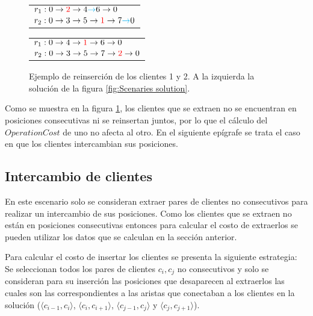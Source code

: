 \documentclass[12pt]{report}
\begin{document}
	\begin{figure}[h]
		\centering
		\begin{minipage}{0.45\textwidth}
			\begin{tabular}{l}
				$r_1:0 \rightarrow \textcolor{red}{2} \rightarrow 4 \textcolor{cyan}{\rightarrow} 6 \rightarrow 0$ \\
				$r_2:0 \rightarrow 3 \rightarrow 5 \rightarrow \textcolor{red}{1} \rightarrow 7 \textcolor{cyan}{\rightarrow} 0$ \\
			\end{tabular}
		\end{minipage}
		\hfill
		\begin{minipage}{0.45\textwidth}
			\begin{tabular}{l}
				$r_1:0 \rightarrow 4 \rightarrow \textcolor{red}{1} \rightarrow 6 \rightarrow 0$ \\
				$r_2:0 \rightarrow 3 \rightarrow 5 \rightarrow 7 \rightarrow \textcolor{red}{2} \rightarrow 0$ \\
			\end{tabular}
		\end{minipage}

		\caption{Ejemplo de reinserción de los clientes 1 y 2. A la izquierda la solución de la figura \ref{fig:Scenaries solution}.}
		\label{fig:Example-reinsert-clients}
              \end{figure}

	Como se muestra en la figura \ref{fig:Example-reinsert-clients}, los clientes que se extraen no se encuentran en posiciones consecutivas ni se reinsertan juntos, por lo que el cálculo del $OperationCost$ de uno no afecta al otro. En el siguiente epígrafe se trata el caso en que los clientes intercambian sus posiciones.

	\subsection{Intercambio de clientes}
	\label{sec:Intercambio de clientes}

	En este escenario solo se consideran extraer pares de clientes no consecutivos para realizar un intercambio de sus posiciones. Como los clientes que se extraen no están en posiciones consecutivas entonces para calcular el costo de extraerlos se pueden utilizar los datos que se calculan en la sección anterior.

	Para calcular el costo de insertar los clientes se presenta la siguiente estrategia: Se seleccionan todos los pares de clientes $c_i,c_j$ no consecutivos y solo se consideran para su inserción las posiciones que desaparecen al extraerlos las cuales son las correspondientes a las aristas que conectaban a los clientes en la solución ($\langle c_{i-1},c_i \rangle$, $\langle c_i,c_{i+1} \rangle$, $\langle c_{j-1},c_j \rangle$ y $\langle c_j,c_{j+1} \rangle$).
\end{document}
